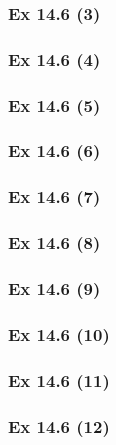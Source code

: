 \subsubsection{Ex 14.6 (3)}\label{sec:Ex_14.6.3}

\subsubsection{Ex 14.6 (4)}\label{sec:Ex_14.6.4}

\subsubsection{Ex 14.6 (5)}\label{sec:Ex_14.6.5}

\subsubsection{Ex 14.6 (6)}\label{sec:Ex_14.6.6}

\subsubsection{Ex 14.6 (7)}\label{sec:Ex_14.6.7}

\subsubsection{Ex 14.6 (8)}\label{sec:Ex_14.6.8}

\subsubsection{Ex 14.6 (9)}\label{sec:Ex_14.6.9}

\subsubsection{Ex 14.6 (10)}\label{sec:Ex_14.6.10}

\newpage		%

\subsubsection{Ex 14.6 (11)}\label{sec:Ex_14.6.11}

\subsubsection{Ex 14.6 (12)}\label{sec:Ex_14.6.12}

